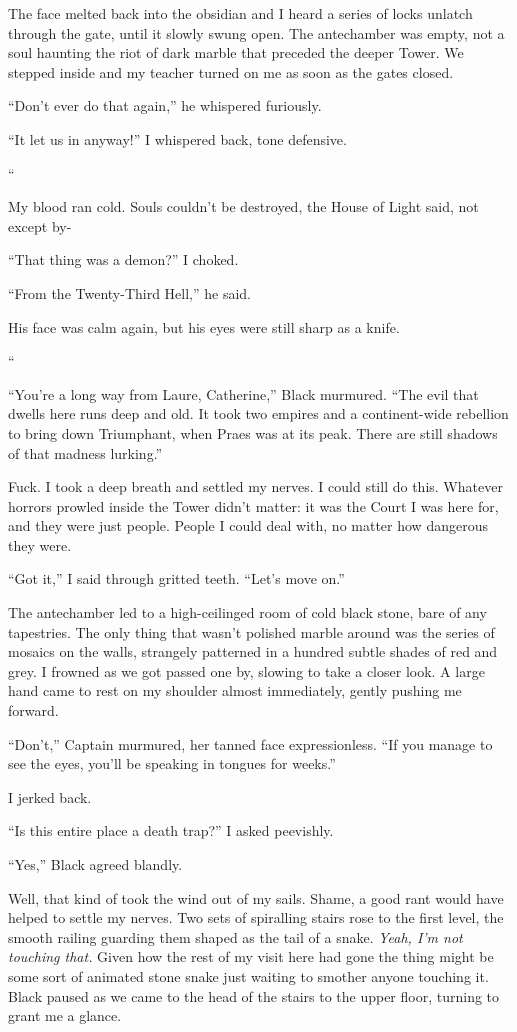 \documentclass[12pt, openany]{book}
\begin{document}
The face melted back into the obsidian and I heard a series of locks unlatch through the gate, until it slowly swung open. The antechamber was empty, not a soul haunting the riot of dark marble that preceded the deeper Tower. We stepped inside and my teacher turned on me as soon as the gates closed.

“Don’t ever do that again,” he whispered furiously.

“It let us in anyway!” I whispered back, tone defensive.

“

My blood ran cold. Souls couldn’t be destroyed, the House of Light said, not except by-

“That thing was a demon?” I choked.

“From the Twenty-Third Hell,” he said.

His face was calm again, but his eyes were still sharp as a knife.

“



“You’re a long way from Laure, Catherine,” Black murmured. “The evil that dwells here runs deep and old. It took two empires and a continent-wide rebellion to bring down Triumphant, when Praes was at its peak. There are still shadows of that madness lurking.”

Fuck. I took a deep breath and settled my nerves. I could still do this. Whatever horrors prowled inside the Tower didn’t matter: it was the Court I was here for, and they were just people. People I could deal with, no matter how dangerous they were.

“Got it,” I said through gritted teeth. “Let’s move on.”

The antechamber led to a high-ceilinged room of cold black stone, bare of any tapestries. The only thing that wasn’t polished marble around was the series of mosaics on the walls, strangely patterned in a hundred subtle shades of red and grey. I frowned as we got passed one by, slowing to take a closer look. A large hand came to rest on my shoulder almost immediately, gently pushing me forward.

“Don’t,” Captain murmured, her tanned face expressionless. “If you manage to see the eyes, you’ll be speaking in tongues for weeks.”

I jerked back.

“Is this entire place a death trap?” I asked peevishly.

“Yes,” Black agreed blandly. 

Well, that kind of took the wind out of my sails. Shame, a good rant would have helped to settle my nerves. Two sets of spiralling stairs rose to the first level, the smooth railing guarding them shaped as the tail of a snake. \textit{Yeah, I’m not touching that.} Given how the rest of my visit here had gone the thing might be some sort of animated stone snake just waiting to smother anyone touching it. Black paused as we came to the head of the stairs to the upper floor, turning to grant me a glance.
\end{document}
